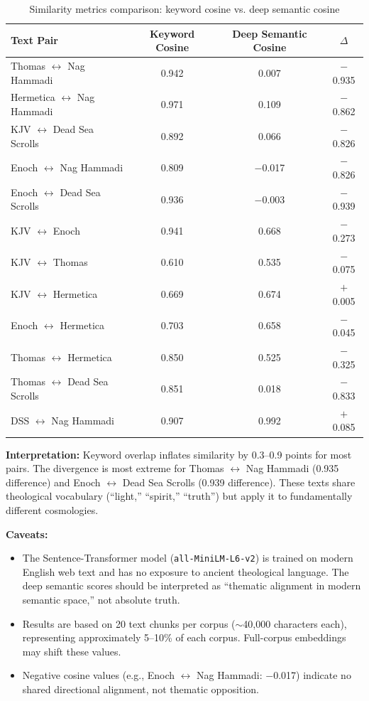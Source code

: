 \documentclass[11pt]{article}
\begin{document}
\begin{table}[h]
\centering
\begin{tabular}{@{}lccc@{}}
\toprule
Text Pair & Keyword Cosine & Deep Semantic Cosine & $\Delta$ \\
\midrule
Thomas $\leftrightarrow$ Nag Hammadi & 0.942 & 0.007 & $-$0.935 \\
Hermetica $\leftrightarrow$ Nag Hammadi & 0.971 & 0.109 & $-$0.862 \\
KJV $\leftrightarrow$ Dead Sea Scrolls & 0.892 & 0.066 & $-$0.826 \\
Enoch $\leftrightarrow$ Nag Hammadi & 0.809 & $-$0.017 & $-$0.826 \\
Enoch $\leftrightarrow$ Dead Sea Scrolls & 0.936 & $-$0.003 & $-$0.939 \\
KJV $\leftrightarrow$ Enoch & 0.941 & 0.668 & $-$0.273 \\
KJV $\leftrightarrow$ Thomas & 0.610 & 0.535 & $-$0.075 \\
KJV $\leftrightarrow$ Hermetica & 0.669 & 0.674 & $+$0.005 \\
Enoch $\leftrightarrow$ Hermetica & 0.703 & 0.658 & $-$0.045 \\
Thomas $\leftrightarrow$ Hermetica & 0.850 & 0.525 & $-$0.325 \\
Thomas $\leftrightarrow$ Dead Sea Scrolls & 0.851 & 0.018 & $-$0.833 \\
DSS $\leftrightarrow$ Nag Hammadi & 0.907 & 0.992 & $+$0.085 \\
\bottomrule
\end{tabular}
\caption{Similarity metrics comparison: keyword cosine vs. deep semantic cosine}
\end{table}

\textbf{Interpretation:} Keyword overlap inflates similarity by 0.3--0.9 points for most pairs. The divergence is most extreme for Thomas $\leftrightarrow$ Nag Hammadi (0.935 difference) and Enoch $\leftrightarrow$ Dead Sea Scrolls (0.939 difference). These texts share theological vocabulary (``light,'' ``spirit,'' ``truth'') but apply it to fundamentally different cosmologies.

\textbf{Caveats:}
\begin{itemize}
    \item The Sentence-Transformer model (\texttt{all-MiniLM-L6-v2}) is trained on modern English web text and has no exposure to ancient theological language. The deep semantic scores should be interpreted as ``thematic alignment in modern semantic space,'' not absolute truth.
    \item Results are based on 20 text chunks per corpus ($\sim$40,000 characters each), representing approximately 5--10\% of each corpus. Full-corpus embeddings may shift these values.
    \item Negative cosine values (e.g., Enoch $\leftrightarrow$ Nag Hammadi: $-$0.017) indicate no shared directional alignment, not thematic opposition.
\end{itemize}
\end{document}
